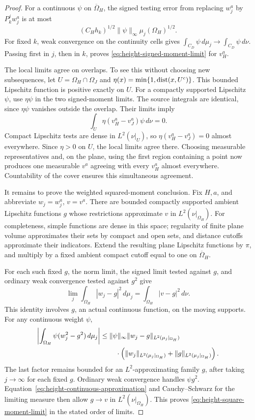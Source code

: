 \begin{proof}
For a continuous $\psi$ on $\overline\Omega_H$, the signed testing error
from replacing $w_j^a$ by $P_k^jw_j^a$ is at most
\[
 (C_Hh_k)^{1/2}\|\psi\|_\infty\mu_j(\Omega_H)^{1/2}.
\]
For fixed $k$, weak convergence on the continuity cells gives
$\int_{C_D}\psi\,d\mu_j\to\int_{C_D}\psi\,d\nu$.  Passing first in
$j$, then in $k$, proves \eqref{eq:height-signed-moment-limit} for
$v_H^a$.

The local limits agree on overlaps.  To see this without choosing new
subsequences, let $U=\Omega_H\cap\Omega_J$ and
$\eta(x)=\min\{1,\operatorname{dist}(x,U^c)\}$.  This bounded Lipschitz function is
positive exactly on $U$.  For a compactly supported Lipschitz $\psi$,
use $\eta\psi$ in the two signed-moment limits.  The source integrals
are identical, since $\eta\psi$ vanishes outside the overlap.  Their
limits imply
\[
 \int_U\eta(v_H^a-v_J^a)\psi\,d\nu=0.
\]
Compact Lipschitz tests are dense in $L^2(\nu|_U)$, so
$\eta(v_H^a-v_J^a)=0$ almost everywhere.  Since $\eta>0$ on $U$,
the local limits agree there.  Choosing measurable representatives and,
on the plane, using the first region containing a point now produces
one measurable $v^a$ agreeing with every $v_H^a$ almost everywhere.
Countability of the cover ensures this simultaneous agreement.

It remains to prove the weighted squared-moment conclusion.  Fix $H,a$,
and abbreviate $w_j=w_j^a$, $v=v^a$.  There are bounded compactly supported
ambient Lipschitz functions $g$ whose restrictions approximate $v$ in
$L^2(\nu|_{\Omega_H})$.  For completeness, simple functions are dense
in this space; regularity of finite plane volume approximates their sets
by compact and open sets, and distance cutoffs approximate their
indicators.  Extend the resulting plane Lipschitz functions by $\pi$,
and multiply by a fixed ambient compact cutoff equal to one on
$\overline\Omega_H$.

For each such fixed $g$, the norm limit, the signed limit tested against
$g$, and ordinary weak convergence tested against $g^2$ give
\begin{equation}
 \lim_j\int_{\Omega_H}|w_j-g|^2\,d\mu_j
       =\int_{\Omega_H}|v-g|^2\,d\nu.
 \label{eq:height-continuous-approximation}
\end{equation}
This identity involves $g$, an actual continuous function, on the moving
supports.  For any continuous weight $\psi$,
\begin{align*}
 \left|\int_{\Omega_H}\psi(w_j^2-g^2)\,d\mu_j\right|
 &\le \|\psi\|_\infty
     \|w_j-g\|_{L^2(\mu_j|_{\Omega_H})}\\
 &\hspace{8mm}\cdot
     \left(\|w_j\|_{L^2(\mu_j|_{\Omega_H})}
                  +\|g\|_{L^2(\mu_j|_{\Omega_H})}\right).
\end{align*}
The last factor remains bounded for an $L^2$-approximating family $g$,
after taking $j\to\infty$ for each fixed $g$.  Ordinary weak convergence
handles $\psi g^2$.  Equation~\eqref{eq:height-continuous-approximation}
and Cauchy--Schwarz for the limiting measure then allow $g\to v$ in
$L^2(\nu|_{\Omega_H})$.  This proves
\eqref{eq:height-square-moment-limit} in the stated order of limits.
\end{proof}


